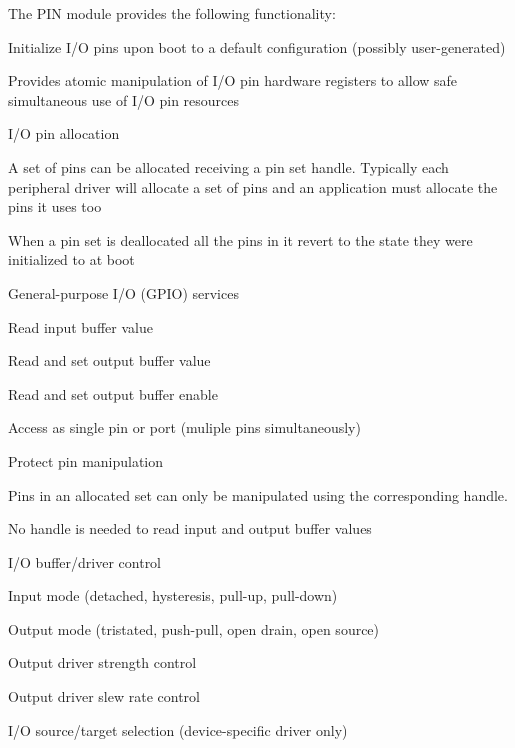 The P\+I\+N module provides the following functionality\+:
\begin{DoxyItemize}
\item Initialize I/\+O pins upon boot to a default configuration (possibly user-\/generated)
\item Provides atomic manipulation of I/\+O pin hardware registers to allow safe simultaneous use of I/\+O pin resources
\item I/\+O pin allocation
\begin{DoxyItemize}
\item A set of pins can be allocated receiving a pin set handle. Typically each peripheral driver will allocate a set of pins and an application must allocate the pins it uses too
\item When a pin set is deallocated all the pins in it revert to the state they were initialized to at boot
\end{DoxyItemize}
\item General-\/purpose I/\+O (G\+P\+I\+O) services
\begin{DoxyItemize}
\item Read input buffer value
\item Read and set output buffer value
\item Read and set output buffer enable
\item Access as single pin or port (muliple pins simultaneously)
\end{DoxyItemize}
\item Protect pin manipulation
\begin{DoxyItemize}
\item Pins in an allocated set can only be manipulated using the corresponding handle.
\item No handle is needed to read input and output buffer values
\end{DoxyItemize}
\item I/\+O buffer/driver control
\begin{DoxyItemize}
\item Input mode (detached, hysteresis, pull-\/up, pull-\/down)
\item Output mode (tristated, push-\/pull, open drain, open source)
\item Output driver strength control
\item Output driver slew rate control
\end{DoxyItemize}
\item I/\+O source/target selection (device-\/specific driver only)
\begin{DoxyItemize}

\end{DoxyItemize}
\end{DoxyItemize}
